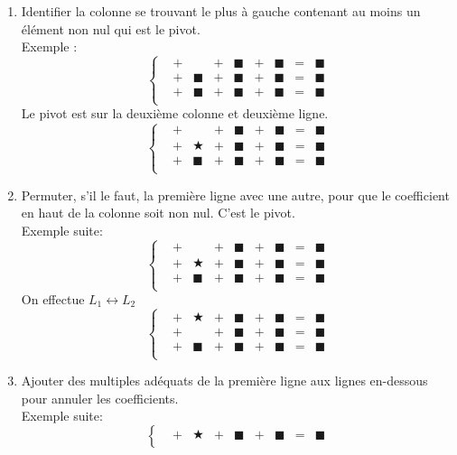 \documentclass[a4paper]{book}
\begin{document}
\begin{Algorithme}
\begin{enumerate}
\item Identifier la colonne se trouvant le plus à gauche contenant au moins un élément non nul qui est le pivot.\\
Exemple : 
$$\left\{{\begin{matrix}
&+&&+&\blacksquare&+&\blacksquare&=&\blacksquare\\
&+&\blacksquare&+&\blacksquare&+&\blacksquare&=&\blacksquare\\
&+&\blacksquare&+&\blacksquare&+&\blacksquare&=&\blacksquare\\
\end{matrix}}\right.$$
Le pivot est sur la deuxième colonne et deuxième ligne. 
$$\left\{{\begin{matrix}
&+&&+&\blacksquare&+&\blacksquare&=&\blacksquare\\
&+&\bigstar&+&\blacksquare&+&\blacksquare&=&\blacksquare\\
&+&\blacksquare&+&\blacksquare&+&\blacksquare&=&\blacksquare\\
\end{matrix}}\right.$$
\item Permuter, s'il le faut, la première ligne avec une autre, pour que le coefficient en haut de la colonne soit non nul. C'est le pivot.\\
Exemple suite: 
$$\left\{{\begin{matrix}
&+&&+&\blacksquare&+&\blacksquare&=&\blacksquare\\
&+&\bigstar&+&\blacksquare&+&\blacksquare&=&\blacksquare\\
&+&\blacksquare&+&\blacksquare&+&\blacksquare&=&\blacksquare\\
\end{matrix}}\right.$$
On effectue $L_1\leftrightarrow L_2$
$$\left\{{\begin{matrix}
&+&\bigstar&+&\blacksquare&+&\blacksquare&=&\blacksquare\\
&+&&+&\blacksquare&+&\blacksquare&=&\blacksquare\\
&+&\blacksquare&+&\blacksquare&+&\blacksquare&=&\blacksquare\\
\end{matrix}}\right.$$
\item Ajouter des multiples adéquats de la première ligne aux lignes en-dessous pour annuler les
coefficients.\\
Exemple suite: 
$$\left\{{\begin{matrix}
&+&\bigstar&+&\blacksquare&+&\blacksquare&=&\blacksquare\\

\end{matrix}}$$
\end{enumerate}
\end{Algorithme}
\end{document}
